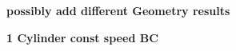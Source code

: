 \textbf{possibly add different Geometry results}

\textbf{1 Cylinder const speed BC}
\begin{figure}[H]
            \begin{subfigure}{0.49\textwidth}
                  \flushleft
          \end{subfigure}\hfill
          \\
            \begin{subfigure}{0.49\textwidth}
                  \flushleft

\end{subfigure}
\end{figure}
